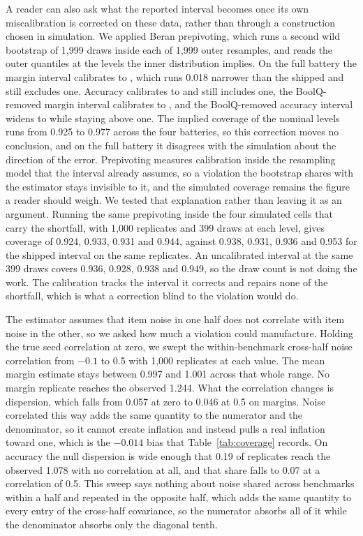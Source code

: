 A reader can also ask what the reported interval becomes once its own miscalibration is corrected on these data, rather than through a construction chosen in simulation. We applied Beran prepivoting, which runs a second wild bootstrap of 1,999 draws inside each of 1,999 outer resamples, and reads the outer quantiles at the levels the inner distribution implies. On the full battery the margin interval calibrates to , which runs 0.018 narrower than the shipped  and still excludes one. Accuracy calibrates to  and still includes one, the BoolQ-removed margin interval calibrates to , and the BoolQ-removed accuracy interval widens to  while staying above one. The implied coverage of the nominal levels runs from 0.925 to 0.977 across the four batteries, so this correction moves no conclusion, and on the full battery it disagrees with the simulation about the direction of the error. Prepivoting measures calibration inside the resampling model that the interval already assumes, so a violation the bootstrap shares with the estimator stays invisible to it, and the simulated coverage remains the figure a reader should weigh. We tested that explanation rather than leaving it as an argument. Running the same prepivoting inside the four simulated cells that carry the shortfall, with 1,000 replicates and 399 draws at each level, gives coverage of 0.924, 0.933, 0.931 and 0.944, against 0.938, 0.931, 0.936 and 0.953 for the shipped interval on the same replicates. An uncalibrated interval at the same 399 draws covers 0.936, 0.928, 0.938 and 0.949, so the draw count is not doing the work. The calibration tracks the interval it corrects and repairs none of the shortfall, which is what a correction blind to the violation would do.

The estimator assumes that item noise in one half does not correlate with item noise in the other, so we asked how much a violation could manufacture. Holding the true seed correlation at zero, we swept the within-benchmark cross-half noise correlation from $-0.1$ to 0.5 with 1,000 replicates at each value. The mean margin estimate stays between 0.997 and 1.001 across that whole range. No margin replicate reaches the observed 1.244. What the correlation changes is dispersion, which falls from 0.057 at zero to 0.046 at 0.5 on margins. Noise correlated this way adds the same quantity to the numerator and the denominator, so it cannot create inflation and instead pulls a real inflation toward one, which is the $-0.014$ bias that Table~\ref{tab:coverage} records. On accuracy the null dispersion is wide enough that 0.19 of replicates reach the observed 1.078 with no correlation at all, and that share falls to 0.07 at a correlation of 0.5. This sweep says nothing about noise shared across benchmarks within a half and repeated in the opposite half, which adds the same quantity to every entry of the cross-half covariance, so the numerator absorbs all of it while the denominator absorbs only the diagonal tenth.

